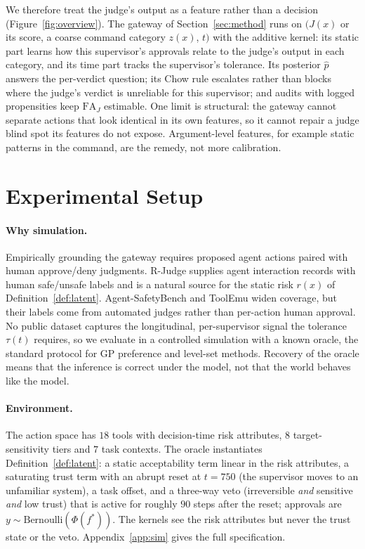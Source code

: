\documentclass[11pt]{article}
\begin{document}
We therefore treat the judge's output as a feature rather than a decision
(Figure~\ref{fig:overview}). The gateway of Section~\ref{sec:method} runs on
$\bigl(J(x)$ or its score, a coarse command category $z(x)$, $t\bigr)$ with
the additive kernel: its static part learns how this supervisor's approvals
relate to the judge's output in each category, and its time part tracks the
supervisor's tolerance. Its posterior $\hat p$ answers the per-verdict
question; its Chow rule escalates rather than blocks where the judge's
verdict is unreliable for this supervisor; and audits with logged propensities
keep $\mathrm{FA}_J$ estimable. One limit is structural: the gateway cannot
separate actions that look identical in its own features, so it cannot repair
a judge blind spot its features do not expose. Argument-level features, for
example static patterns in the command, are the remedy, not more calibration.

\section{Experimental Setup}\label{sec:setup}

\paragraph{Why simulation.} Empirically grounding the gateway requires
proposed agent actions paired with human approve/deny judgments. R-Judge
\citep{yuan-etal-2024-rjudge} supplies agent interaction records with human
safe/unsafe labels and is a natural source for the static risk $r(x)$ of
Definition~\ref{def:latent}. Agent-SafetyBench \citep{zhang2024agentsafetybench}
and ToolEmu \citep{ruan2024toolemu} widen coverage, but their labels come from
automated judges rather than per-action human approval. No public dataset
captures the longitudinal, per-supervisor signal the tolerance $\tau(t)$
requires, so we evaluate in a controlled simulation with a known oracle, the
standard protocol for GP preference and level-set methods. Recovery of the
oracle means that the inference is correct under the model, not that the
world behaves like the model.

\paragraph{Environment.} The action space has $18$ tools with decision-time
risk attributes, $8$ target-sensitivity tiers and $7$ task contexts. The
oracle instantiates Definition~\ref{def:latent}: a static acceptability term
linear in the risk attributes, a saturating trust term with an abrupt reset
at $t = 750$ (the supervisor moves to an unfamiliar system), a task offset,
and a three-way veto (irreversible \emph{and} sensitive \emph{and} low trust)
that is active for roughly $90$ steps after the reset; approvals are
$y \sim \mathrm{Bernoulli}(\Phi(f^*))$. The kernels see the risk attributes
but never the trust state or the veto. Appendix~\ref{app:sim} gives the full
specification.
\end{document}
